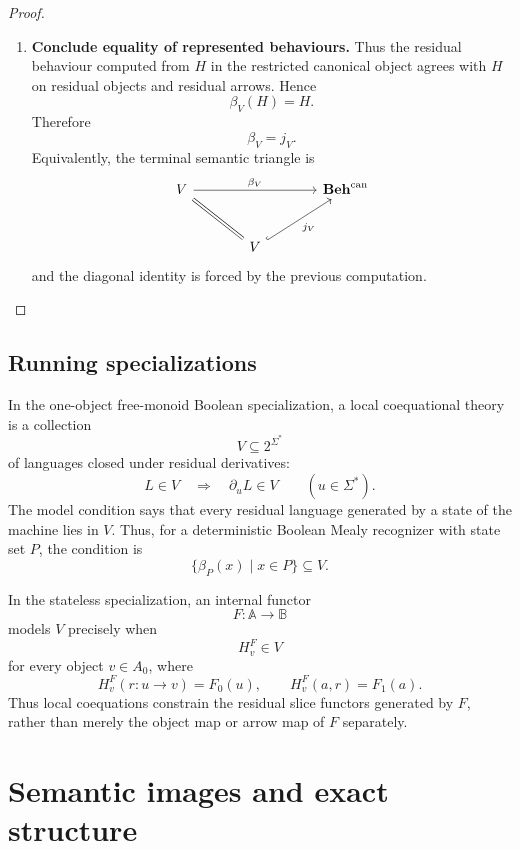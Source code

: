 \begin{proof}
\begin{enumerate}
        \item \textbf{Conclude equality of represented behaviours.}
        Thus the residual behaviour computed from \(H\) in the restricted
        canonical object agrees with \(H\) on residual objects and residual
        arrows. Hence
        \[
            \beta_V(H)=H.
        \]
        Therefore
        \[
            \beta_V=j_V.
        \]
        Equivalently, the terminal semantic triangle is
        \[
        \begin{tikzcd}[column sep=large, row sep=large]
            V
                \arrow[rr, "\beta_V"]
                \arrow[dr, equal]
            &&
            \mathbf{Beh}^{\mathrm{can}}
            \\
            &
            V
                \arrow[ur, hook, "j_V"']
            &
        \end{tikzcd}
        \]
        and the diagonal identity is forced by the previous computation.
    \end{enumerate}
\end{proof}

\subsection{Running specializations}
\label{subsec:local-coeq-running-specializations}

In the one-object free-monoid Boolean specialization, a local coequational
theory is a collection
\[
    V\subseteq 2^{\Sigma^*}
\]
of languages closed under residual derivatives:
\[
    L\in V
    \quad\Longrightarrow\quad
    \partial_uL\in V
    \qquad
    (u\in\Sigma^*).
\]
The model condition says that every residual language generated by a state of
the machine lies in \(V\). Thus, for a deterministic Boolean Mealy recognizer
with state set \(P\), the condition is
\[
    \{\beta_P(x)\mid x\in P\}\subseteq V.
\]

In the stateless specialization, an internal functor
\[
    F:\mathbb A\to\mathbb B
\]
models \(V\) precisely when
\[
    H^F_v\in V
\]
for every object \(v\in A_0\), where
\[
    H^F_v(r:u\to v)=F_0(u),
    \qquad
    H^F_v(a,r)=F_1(a).
\]
Thus local coequations constrain the residual slice functors generated by
\(F\), rather than merely the object map or arrow map of \(F\) separately.

\section{Semantic images and exact structure}
\label{sec:regular-semantic-images}

